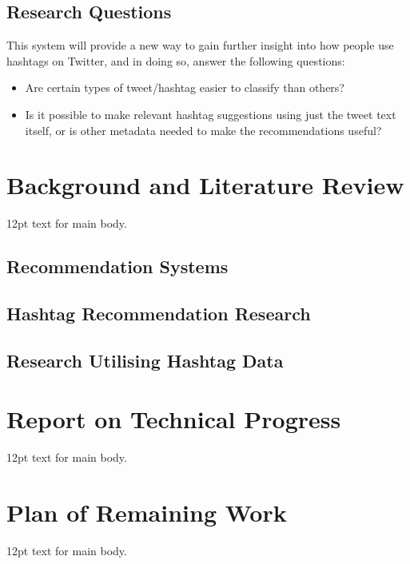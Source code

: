 \documentclass[12pt,a4paper]{article}
\begin{document}
\subsection{Research Questions}
This system will provide a new way to gain further insight into how people use hashtags on Twitter, and in doing so, answer the following questions:
\begin{itemize}
    \item Are certain types of tweet/hashtag easier to classify than others?
    \item Is it possible to make relevant hashtag suggestions using just the tweet text itself, or is other metadata needed to make the recommendations useful?
\end{itemize}
\pagebreak

\section{Background and Literature Review}
12pt text for main body.
\subsection{Recommendation Systems}

\subsection{Hashtag Recommendation Research}

\subsection{Research Utilising Hashtag Data}
\pagebreak

\section{Report on Technical Progress}
12pt text for main body.
\pagebreak

\section{Plan of Remaining Work}
12pt text for main body.
\pagebreak
\end{document}
